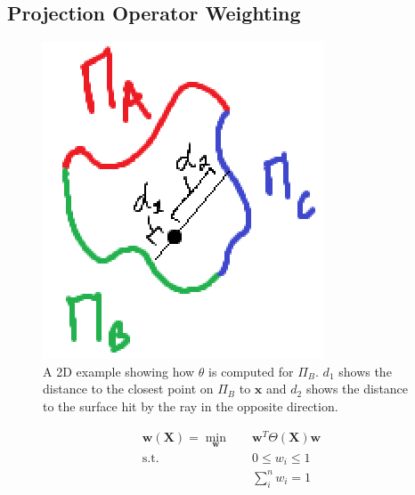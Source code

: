 \subsection{Projection Operator Weighting}
\begin{figure}[h]
  \centering
  \includegraphics[width=\linewidth]{figures/distance_weighting}
  \caption{A 2D example showing how $\theta$ is computed for $\Pi_B$. $d_1$ shows the distance to the closest point on $\Pi_B$ to $\mathbf{x}$ and $d_2$ shows the distance to the surface hit by the ray in the opposite direction.}
\end{figure}

\begin{equation}
\begin{aligned}
\mathbf{w}(\mathbf{X}) = \min_{\mathbf{w}} \quad & \mathbf{w}^T \Theta(\mathbf{X}) \mathbf{w}    \\
\textrm{s.t.} \quad & 0 \leq w_i \leq 1                     \\
                    &   \sum_i^n w_i = 1                      \\
\end{aligned}
\end{equation}

